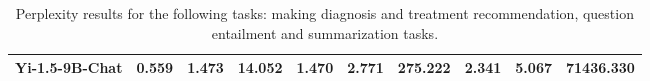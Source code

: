 \begin{table*}[h]
{\begin{tabular}{l|ccc|ccc|ccc}
Yi-1.5-9B-Chat & 0.559 & 1.473 & 14.052 & 1.470 & 2.771 & 275.222 & 2.341 & 5.067 & 71436.330 \\
\bottomrule
\end{tabular}%
}
\caption{Perplexity results for the following tasks: making diagnosis and treatment recommendation, question entailment and summarization tasks.}
\end{table*}